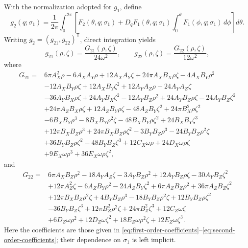 \documentclass[11pt]{amsart}
\theoremstyle{remark}
\begin{document}
With the normalization adopted for \(g_1\), define
\begin{equation}\label{eq:g2-definition}
 g_2(q;\sigma_1)
 =\frac1{2\pi}\int_0^{2\pi}
 \left[
 F_2(\theta,q;\sigma_1)
 +D_qF_1(\theta,q;\sigma_1)
  \int_0^\theta F_1(\phi,q;\sigma_1)\,d\phi
 \right]d\theta.
\end{equation}
Writing \(g_2=(g_{21},g_{22})^{\mathsf T}\), direct integration yields
\begin{equation}\label{eq:g2-components}
 g_{21}(\rho,\zeta)=\frac{G_{21}(\rho,\zeta)}{24\omega^2},
 \qquad
 g_{22}(\rho,\zeta)=\frac{G_{22}(\rho,\zeta)}{12\omega^2},
\end{equation}
where
\begin{equation}\label{eq:G21}
\begin{aligned}
G_{21}={}&6\pi A_X^2\rho-6A_XA_Y\rho+12A_XA_Y\zeta
+24\pi A_XB_X\rho\zeta-4A_XB_Y\rho^2\\
&-12A_XB_Y\rho\zeta+12A_XB_Y\zeta^2
+12A_YA_Z\rho-24A_YA_Z\zeta\\
&-36A_YB_X\rho\zeta+24A_YB_X\zeta^2
-12A_YB_Z\rho^2+24A_YB_Z\rho\zeta-24A_YB_Z\zeta^2\\
&+24\pi A_ZB_X\rho\zeta+12A_ZB_Y\rho\zeta
-48A_ZB_Y\zeta^2+24\pi B_X^2\rho\zeta^2\\
&-6B_XB_Y\rho^3-8B_XB_Y\rho^2\zeta
-48B_XB_Y\rho\zeta^2+24B_XB_Y\zeta^3\\
&+12\pi B_XB_Z\rho^3+24\pi B_XB_Z\rho\zeta^2
-3B_YB_Z\rho^3-24B_YB_Z\rho^2\zeta\\
&+36B_YB_Z\rho\zeta^2-48B_YB_Z\zeta^3
+12C_X\omega\rho+24D_X\omega\rho\zeta\\
&+9E_X\omega\rho^3+36E_X\omega\rho\zeta^2,
\end{aligned}
\end{equation}
and
\begin{equation}\label{eq:G22}
\begin{aligned}
G_{22}={}&6\pi A_XB_Z\rho^2-18A_YA_Z\zeta-3A_YB_Z\rho^2
+12A_YB_Z\rho\zeta-30A_YB_Z\zeta^2\\
&+12\pi A_Z^2\zeta-6A_ZB_Y\rho^2-24A_ZB_Y\zeta^2
+6\pi A_ZB_Z\rho^2+36\pi A_ZB_Z\zeta^2\\
&+12\pi B_XB_Z\rho^2\zeta+4B_YB_Z\rho^3
-18B_YB_Z\rho^2\zeta+12B_YB_Z\rho\zeta^2\\
&-36B_YB_Z\zeta^3+12\pi B_Z^2\rho^2\zeta
+24\pi B_Z^2\zeta^3+12C_Z\omega\zeta\\
&+6D_Z\omega\rho^2+12D_Z\omega\zeta^2
+18E_Z\omega\rho^2\zeta+12E_Z\omega\zeta^3.
\end{aligned}
\end{equation}
Here the coefficients are those given in
\eqref{eq:first-order-coefficients}--\eqref{eq:second-order-coefficients};
their dependence on \(\sigma_1\) is left implicit.
\end{document}
